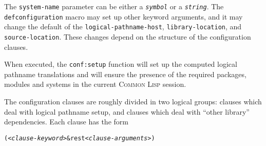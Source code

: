 \documentclass[a4paper]{article}
\newcommand{\CL}{\textsc{Common Lisp}}
\newcommand{\defconfiguration}{\texttt{defconfiguration}}
\newcommand{\code}[1]{\texttt{#1}}
\newcommand{\clobject}[1]{\texttt{\textit{#1}}} %
\begin{document}
\noindent
The \code{system-name} parameter can be either a \clobject{symbol} or
a \clobject{string}.  The \defconfiguration{} macro may set up other
keyword arguments, and it may change the default of the
\code{logical-pathname-host}, \code{library-location}, and
\code{source-location}.  These changes depend on the structure of the
configuration clauses.

When executed, the \code{conf:setup} function will set up the computed
logical pathname translations and will ensure the presence of the
required packages, modules and systems in the current \CL{} session.

The configuration clauses are roughly divided in two logical groups:
clauses which deal with logical pathname setup, and clauses which deal
with ``other library'' dependencies.  Each clause has the form

\begin{alltt}
(\emph{<clause-keyword>} &rest \emph{<clause-arguments>})
\end{alltt}
\end{document}
